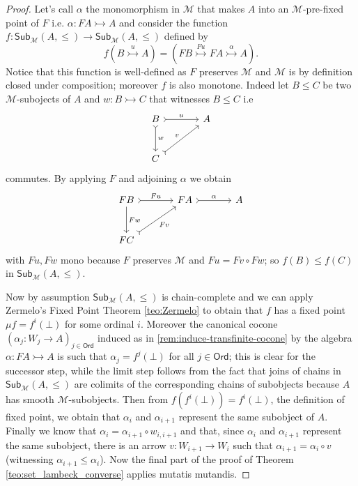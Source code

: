 \documentclass[letterpaper, 11pt, oneside]{memoir}
\theoremstyle{myteo}
\numberwithin{equation}{section}
\newcommand{\Ord}{\textsf{Ord}}
\newcommand{\Sub}{\textsf{Sub}}
\begin{document}
\begin{proof}
  Let's call \(\alpha\) the monomorphism in \(\mathcal{M}\) that makes \(A\) into an \(\mathcal{M}\)-pre-fixed point of \(F\) i.e. \(\alpha : FA \rightarrowtail A\) and consider the function \(f : \Sub_{\mathcal{M}}(A, \leq) \to \Sub_{\mathcal{M}}(A, \leq)\) defined by
  \begin{equation*}
    f(B \overset{u}{\rightarrowtail} A) = (FB \overset{Fu}{\rightarrowtail} FA \overset{\alpha}{\rightarrowtail} A).
  \end{equation*}
  Notice that this function is well-defined as \(F\) preserves \(\mathcal{M}\) and \(\mathcal{M}\) is by definition closed under composition; moreover \(f\) is also monotone.
  Indeed let \(B \leq C\) be two \(\mathcal{M}\)-subojects of \(A\) and \(w : B \rightarrowtail C\) that witnesses \(B \leq C\) i.e
  \begin{equation*}
    \begin{tikzcd}[sep=large]
      B \ar[r, tail, "u"] \ar[d, tail, "w"] & A \\
      C \ar[ru, tail, "v"]&
    \end{tikzcd}
  \end{equation*}
  commutes.
  By applying \(F\) and adjoining \(\alpha\) we obtain
  \begin{equation*}
    \begin{tikzcd}[sep=large]
      FB \ar[r, tail, "Fu"] \ar[d, "Fw"] & FA \ar[r, tail, "\alpha"] & A \\
      FC \ar[ru, tail, "Fv"']
    \end{tikzcd}
  \end{equation*}
  with \(Fu, Fw\) mono because \(F\) preserves \(\mathcal{M}\) and \(Fu = Fv \circ Fw\); so \(f(B) \leq f(C)\) in \(\Sub_\mathcal{M}(A, \leq)\).

  Now by assumption \(\Sub_{\mathcal{M}}(A, \leq)\) is chain-complete and we can apply Zermelo's Fixed Point Theorem \ref{teo:Zermelo} to obtain that \(f\) has a fixed point \(\mu f = f^i(\bot)\) for some ordinal \(i\).
  Moreover the canonical cocone \((\alpha_j : W_j \to A)_{j\in\Ord}\) induced as in \ref{rem:induce-transfinite-cocone} by the algebra \(\alpha : FA \rightarrowtail A\) is such that \(\alpha_j = f^j(\bot)\) for all \(j \in \Ord\); this is clear for the successor step, while the limit step follows from the fact that joins of chains in \(\Sub_\mathcal{M}(A, \leq)\) are colimits of the corresponding chains of subobjects because \(A\) has smooth \(\mathcal{M}\)-subobjects.
  Then from \(f(f^i(\bot)) = f^i(\bot)\), the definition of fixed point, we obtain that \(\alpha_i\) and \(\alpha_{i+1}\) represent the same subobject of \(A\).
  Finally we know that \(\alpha_i = \alpha_{i+1} \circ w_{i, i+1}\) and that, since \(\alpha_i\) and \(\alpha_{i+1}\) represent the same subobject, there is an arrow \(v : W_{i+1} \to W_i\) such that \(\alpha_{i+1} = \alpha_i \circ v\) (witnessing \(\alpha_{i+1} \leq \alpha_i\)).
  Now the final part of the proof of Theorem \ref{teo:set_lambeck_converse} applies mutatis mutandis.
\end{proof}
\end{document}
